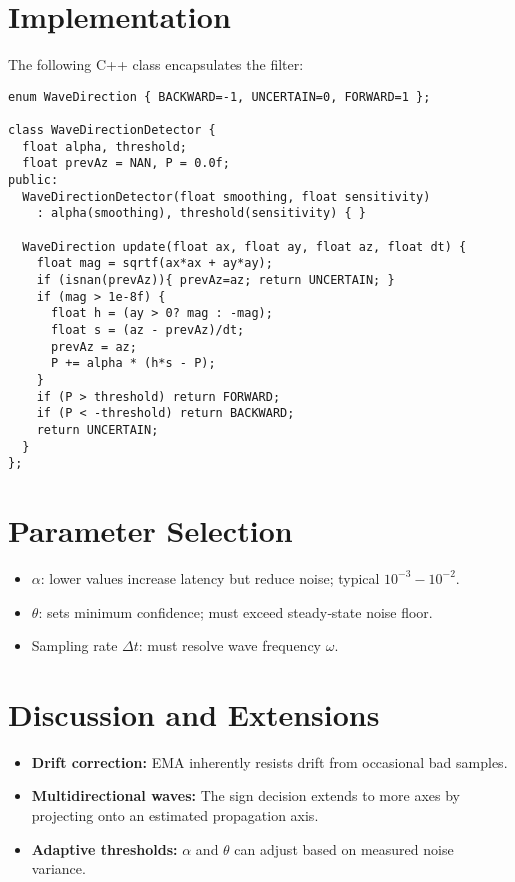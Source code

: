 \documentclass[11pt,letterpaper]{article}
\begin{document}
\section{Implementation}
The following C++ class encapsulates the filter:

\begin{verbatim}
enum WaveDirection { BACKWARD=-1, UNCERTAIN=0, FORWARD=1 };

class WaveDirectionDetector {
  float alpha, threshold;
  float prevAz = NAN, P = 0.0f;
public:
  WaveDirectionDetector(float smoothing, float sensitivity)
    : alpha(smoothing), threshold(sensitivity) { }

  WaveDirection update(float ax, float ay, float az, float dt) {
    float mag = sqrtf(ax*ax + ay*ay);
    if (isnan(prevAz)){ prevAz=az; return UNCERTAIN; }
    if (mag > 1e-8f) {
      float h = (ay > 0? mag : -mag);
      float s = (az - prevAz)/dt;
      prevAz = az;
      P += alpha * (h*s - P);
    }
    if (P > threshold) return FORWARD;
    if (P < -threshold) return BACKWARD;
    return UNCERTAIN;
  }
};
\end{verbatim}

\section{Parameter Selection}
\begin{itemize}
  \item \(\alpha\): lower values increase latency but reduce noise; typical \(10^{-3}\!-\!10^{-2}\).
  \item \(\theta\): sets minimum confidence; must exceed steady‐state noise floor.
  \item Sampling rate \(\Delta t\): must resolve wave frequency \(\omega\).
\end{itemize}

\section{Discussion and Extensions}
\begin{itemize}
  \item \textbf{Drift correction:} EMA inherently resists drift from occasional bad samples.
  \item \textbf{Multidirectional waves:} The sign decision extends to more axes by projecting onto an estimated propagation axis.
  \item \textbf{Adaptive thresholds:} \(\alpha\) and \(\theta\) can adjust based on measured noise variance.
\end{itemize}
\end{document}
